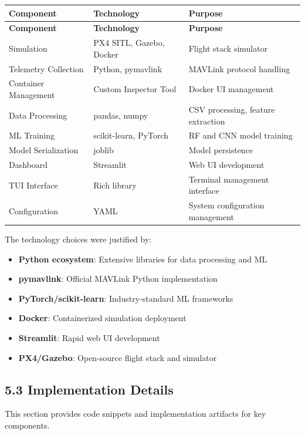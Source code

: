 \documentclass[12pt,a4paper]{article}
\begin{document}
\begin{longtable}{|p{4cm}|p{5cm}|p{6cm}|}
\hline
\textbf{Component} & \textbf{Technology} & \textbf{Purpose} \\
\hline
\endfirsthead
\hline
\textbf{Component} & \textbf{Technology} & \textbf{Purpose} \\
\hline
\endhead
\hline
Simulation & PX4 SITL, Gazebo, Docker & Flight stack simulator \\
\hline
Telemetry Collection & Python, pymavlink & MAVLink protocol handling \\
\hline
Container Management & Custom Inspector Tool & Docker UI management \\
\hline
Data Processing & pandas, numpy & CSV processing, feature extraction \\
\hline
ML Training & scikit-learn, PyTorch & RF and CNN model training \\
\hline
Model Serialization & joblib & Model persistence \\
\hline
Dashboard & Streamlit & Web UI development \\
\hline
TUI Interface & Rich library & Terminal management interface \\
\hline
Configuration & YAML & System configuration management \\
\hline
\end{longtable}

The technology choices were justified by:

\begin{itemize}
    \item \textbf{Python ecosystem}: Extensive libraries for data processing and ML
    \item \textbf{pymavlink}: Official MAVLink Python implementation
    \item \textbf{PyTorch/scikit-learn}: Industry-standard ML frameworks
    \item \textbf{Docker}: Containerized simulation deployment
    \item \textbf{Streamlit}: Rapid web UI development
    \item \textbf{PX4/Gazebo}: Open-source flight stack and simulator
\end{itemize}

\subsection{5.3 Implementation Details}

This section provides code snippets and implementation artifacts for key components.
\end{document}
